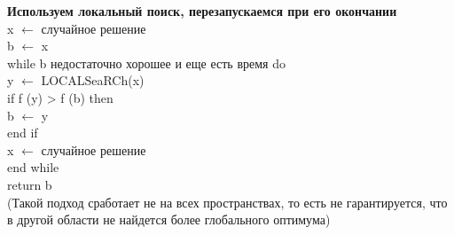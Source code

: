 \textbf{Используем локальный поиск, перезапускаемся при его окончании}
\\
x $\leftarrow$ случайное решение  \\
b $\leftarrow$ x \\ 
while b недостаточно хорошее и еще есть время do \\
\tab y $\leftarrow$ LOCALSeaRCh(x)  \\
\tab if f (y) > f (b) then  \\
\tab \tab b $\leftarrow$ y  \\
\tab end if  \\
\tab x $\leftarrow$ случайное решение  \\
end while\\
return b\\

(Такой подход сработает не на всех пространствах, то есть не гарантируется, что в другой области не найдется более глобального оптимума)
